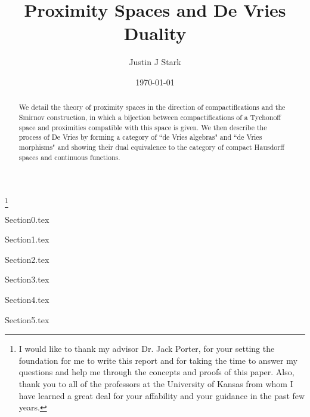 \documentclass[12pt]{amsart}
\theoremstyle{definition}
\theoremstyle{remark}
\begin{document}
	\title{Proximity Spaces and De Vries Duality}

	\author{Justin J Stark}
	\address{Department of Mathematics\\
		University of Kansas\\
		405 Snow Hall\\
		1460 Jayhawk Blvd\\
		Lawrence, KS 66045-7594, USA}

	\thanks{I would like to thank my advisor Dr. Jack Porter, for your setting the foundation for me to write this report and for taking the time to answer my questions and help me through the concepts and proofs of this paper.  Also, thank you to all of the professors at the University of Kansas from whom I have learned a great deal for your affability and your guidance in the past few years.}

	\date{\today}

	\begin{abstract}
		We detail the theory of proximity spaces in the direction of compactifications and the Smirnov construction, in which a bijection between compactifications of a Tychonoff space and proximities compatible with this space is given.  We then describe the process of De Vries \cite{devries} by forming a category of ``de Vries algebras" and ``de Vries morphisms" and showing their dual equivalence to the category of compact Hausdorff spaces and continuous functions.  %
	\end{abstract}

	\maketitle
	
	\tableofcontents
	
	{Section0.tex}	%

	{Section1.tex}	%
	
	{Section2.tex}	%
	
	{Section3.tex} %
	
	{Section4.tex}	%
	
	{Section5.tex}	%
	
	
	\nocite{naimpally,givant,bezhanishvili,devries,smirnov}
	
	
\end{document}
